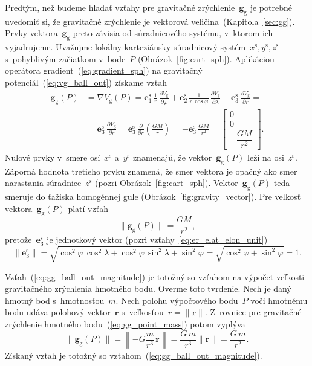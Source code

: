 \documentclass[a4paper, 12pt]{book}
\newcommand{\gidx}{\mathrm g}
\let\vec\mathbf
\begin{document}
Predtým, než budeme hľadať vzťahy pre gravitačné zrýchlenie~$\vec g_\gidx$ je 
potrebné uvedomiť si, že gravitačné zrýchlenie je vektorová 
veličina~(Kapitola~\ref{sec:gg}).  Prvky vektora~$\vec g_\gidx$ preto závisia 
od súradnicového systému, v~ktorom ich vyjadrujeme.  Uvažujme lokálny 
karteziánsky súradnicový systém~$x^\mathrm{s}, y^\mathrm{s}, z^\mathrm{s}$ 
s~pohyblivým začiatkom v~bode~$P$ (Obrázok~\ref{fig:cart_sph}).  Aplikáciou 
operátora gradient~(\ref{eq:gradient_sph}) na gravitačný 
potenciál~(\ref{eq:vg_ball_out}) získame vzťah
%
\begin{equation}
\label{eq:gg_ball}
\begin{split}
\vec g_\gidx(P) &= \nabla V_\gidx(P) = \vec e_1^\mathrm{s} \, \frac{1}{r} \, 
\frac{\partial V_\gidx}{\partial \varphi} + \vec e_2^\mathrm{s} \, \frac{1}{r 
\, \cos\varphi} \, \frac{\partial V_\gidx}{\partial \lambda} + \vec 
e_3^\mathrm{s} \, \frac{\partial V_\gidx}{\partial r} =\\
%
&=\vec e_3^\mathrm{s} \, \frac{\partial V_\gidx}{\partial r} = \vec 
e_3^\mathrm{s} \, \frac{\partial}{\partial r}\left( \frac{GM}{r} \right) 
= -\vec e_3^\mathrm{s} \, \frac{GM}{r^2}
%
=
%
\begin{bmatrix}
0\\
0\\
-\dfrac{GM}{r^2}
\end{bmatrix}
%
{.}
\end{split}
\end{equation}
%
Nulové prvky v~smere osí~$x^\mathrm{s}$ a~$y^\mathrm{s}$ znamenajú, že 
vektor~$\vec g_\gidx(P)$ leží na osi~$z^\mathrm{s}$.  Záporná hodnota tretieho 
prvku znamená, že smer vektora je opačný ako smer narastania 
súradnice~$z^\mathrm{s}$ (pozri Obrázok~\ref{fig:cart_sph}).  Vektor~$\vec 
g_\gidx(P)$ teda smeruje do ťažiska homogénnej gule 
(Obrázok~\ref{fig:gravity_vector}).  Pre veľkosť vektora~$\vec g_\gidx(P)$ 
platí vzťah
%
\begin{equation}
\label{eq:gg_ball_out_magnitude}
\| \vec g_\gidx(P) \| = \frac{GM}{r^2}{,}
\end{equation}
%
pretože~$\vec e_3^\mathrm{s}$ je jednotkový vektor (pozri 
vzťahy~\ref{eq:er_elat_elon_unit})
%
\begin{equation}
\| \vec e_3^\mathrm{s} \| = \sqrt{\cos^2\varphi \, \cos^2\lambda 
+ \cos^2\varphi \, \sin^2\lambda + \sin^2\varphi} = \sqrt{\cos^2\varphi 
+ \sin^2\varphi} = 1{.}
\end{equation}

Vzťah~(\ref{eq:gg_ball_out_magnitude}) je totožný so vzťahom na výpočet 
veľkosti gravitačného zrýchlenia hmotného bodu.  Overme toto tvrdenie.  Nech je 
daný hmotný bod s~hmotnosťou~$m$.  Nech polohu výpočtového bodu~$P$ voči 
hmotnému bodu udáva polohový vektor~$\vec r$ s~veľkosťou~$r = \| \vec r \|$.  
Z~rovnice pre gravitačné zrýchlenie hmotného bodu~(\ref{eq:gg_point_mass}) 
potom vyplýva
%
\begin{equation}
\label{eq:gg_point_mass_magnitude}
\| \vec g_\gidx(P) \| = \left\lVert -G \frac{m}{r^3} \, \vec r \right\rVert 
= \frac{G \, m}{r^3} \| \vec r \| = \frac{G \, m}{r^2}{.}
\end{equation}
%
Získaný vzťah je totožný so vzťahom~(\ref{eq:gg_ball_out_magnitude}).
\end{document}
